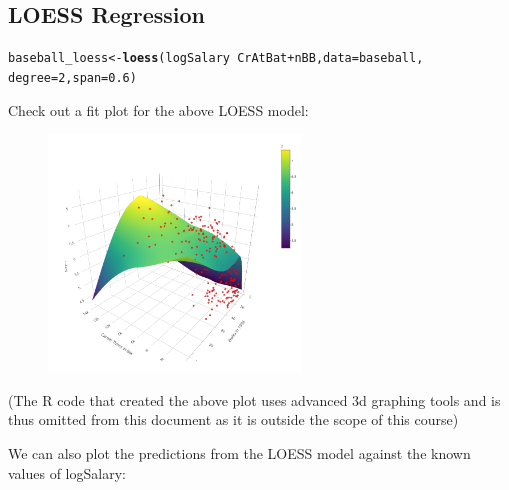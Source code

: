 \documentclass{article}\usepackage[]{graphicx}\usepackage[]{color}
\makeatletter
\newcommand{\hlnum}[1]{\textcolor[rgb]{0.686,0.059,0.569}{#1}}%
\newcommand{\hlopt}[1]{\textcolor[rgb]{0,0,0}{#1}}%
\newcommand{\hlstd}[1]{\textcolor[rgb]{0.345,0.345,0.345}{#1}}%
\newcommand{\hlkwb}[1]{\textcolor[rgb]{0.69,0.353,0.396}{#1}}%
\newcommand{\hlkwc}[1]{\textcolor[rgb]{0.333,0.667,0.333}{#1}}%
\newcommand{\hlkwd}[1]{\textcolor[rgb]{0.737,0.353,0.396}{\textbf{#1}}}%
\newenvironment{kframe}{%
 \def\at@end@of@kframe{}%
 \ifinner\ifhmode%
  \def\at@end@of@kframe{\end{minipage}}%
  \begin{minipage}{\columnwidth}%
 \fi\fi%
 \def\FrameCommand##1{\hskip\@totalleftmargin \hskip-\fboxsep
 \colorbox{shadecolor}{##1}\hskip-\fboxsep
     \hskip-\linewidth \hskip-\@totalleftmargin \hskip\columnwidth}%
 \MakeFramed {\advance\hsize-\width
   \@totalleftmargin\z@ \linewidth\hsize
   \@setminipage}}%
 {\par\unskip\endMakeFramed%
 \at@end@of@kframe}
\newenvironment{knitrout}{}{} %
\makeatother
\begin{document}
\newpage

\subsection*{LOESS Regression}

\begin{knitrout}
\color{fgcolor}\begin{kframe}
\begin{alltt}
\hlstd{baseball_loess} \hlkwb{<-} \hlkwd{loess}\hlstd{(logSalary} \hlopt{~} \hlstd{CrAtBat} \hlopt{+} \hlstd{nBB,} \hlkwc{data} \hlstd{= baseball,}
                        \hlkwc{degree} \hlstd{=} \hlnum{2}\hlstd{,} \hlkwc{span} \hlstd{=} \hlnum{0.6}\hlstd{)}
\end{alltt}
\end{kframe}
\end{knitrout}

Check out a fit plot for the above LOESS model:

\begin{figure}[H]
	\centering
	\includegraphics[width=0.6\textwidth]{4_3_1NonParReg_R_loessplot.png}
	\label{fig:myfig}
\end{figure}

(The R code that created the above plot uses advanced 3d graphing tools and is thus omitted from this document as it is outside the scope of this course)

We can also plot the predictions from the LOESS model against the known values of logSalary:
\end{document}
